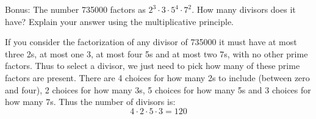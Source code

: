 \documentclass[11pt]{exam}
\begin{document}
\begin{questions}
\bonusquestion[3] Bonus: The number 735000 factors as $2^3 \cdot 3 \cdot 5^4 \cdot 7^2$.  How many divisors does it have?  Explain your answer using the multiplicative principle.
	\begin{solution}
		If you consider the factorization of any divisor of 735000 it must have at most three 2s, at most one 3, at most four 5s and at most two 7s, with no other prime factors.  Thus to select a divisor, we just need to pick how many of these prime factors are present.  There are 4 choices for how many 2s to include (between zero and four), 2 choices for how many 3s, 5 choices for how many 5s and 3 choices for how many 7s.  Thus the number of divisors is:
		\[4\cdot 2 \cdot 5 \cdot 3 = 120\]
	\end{solution}

\end{questions}
\end{document}
